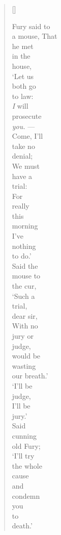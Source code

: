 \settowidth{\versewidth}{a mouse that morning}
 \begin{verse}[\versewidth]
 \setlength{\vgap}{1em}
 \begin{patverse}
 \large Fury said to \\
   a mouse, That \\
   he met \\
   in the \\
   house, \\
 \normalsize `Let us \\
   both go \\
   to law: \\
   \emph{I} will \\
   prosecute \\
   \textit{you.} --- \\
   Come, I'll \\
 \small take no \\
   denial; \\
   We must \\
   have a \\
   trial: \\
   For \\
 \footnotesize really \\
   this \\
   morning \\
   I've \\
   nothing \\
   to do.' \\
   Said the \\
   mouse to \\
 \scriptsize the cur, \\
   `Such a \\
   trial, \\
   dear sir, \\
   With no \\
   jury or \\
   judge, \\
   would be \\
   wasting \\
   our breath.' \\
 \tiny  `I'll be \\
   judge, \\
   I'll be \\
   jury.' \\
   Said \\
   cunning \\
   old Fury; \\
   `I'll try \\
   the whole \\
   cause \\
   and \\
   condemn \\
   you \\
   to \\
   death.'  \par
 \end{patverse}
 \end{verse}
